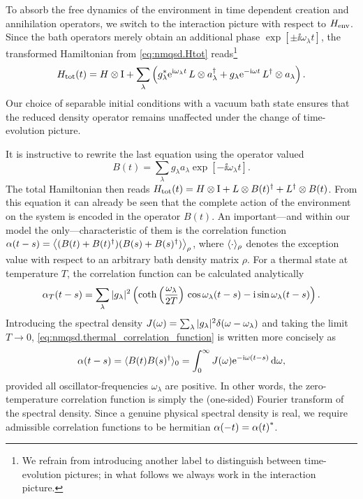 To absorb the free dynamics of the environment in time dependent creation and annihilation operators, we switch to the interaction picture with respect to $H_\mathrm{env}$.
Since the bath operators merely obtain an additional phase $\exp[\pm \ii \omega_\lambda t]$, the transformed Hamiltonian from \autoref{eq:nmqsd.Htot} reads\footnote{%
  We refrain from introducing another label to distinguish between time-evolution pictures; in what follows we always work in the interaction picture.
}
\begin{equation}
  \Htot(t) = \Hsys \otimes \unit  +  \sum_\lambda \left( \cc{g}_\lambda \exp[\ii \omega_\lambda t] \, L \otimes \adj{a}_\lambda + g_\lambda \exp[-\ii \omega t] \, \adj{L} \otimes a_\lambda \right).
  \label{eq:nmqsd.Htot}
\end{equation}
Our choice of separable initial conditions with a vacuum bath state ensures that the reduced density operator remains unaffected under the change of time-evolution picture.

It is instructive to rewrite the last equation using the operator valued 
\begin{equation}
  B(t)=\sum_\lambda g_\lambda a_\lambda \exp[-\ii\omega_\lambda t].
  \label{eq:nmqsd.force_operator}
\end{equation}
The total Hamiltonian then reads $H_\mathrm{tot}(t) = H \otimes \mathrm{I}  +  L \otimes B(t)^\dagger  +  L^\dagger \otimes B(t)$.
From this equation it can already be seen that the complete action of the environment on the system is encoded in the operator $B(t)$.
An important---and within our model the only---characteristic of them is the correlation function $\alpha(t-s) = \big\langle  (B(t) + B(t)^\dagger)(B(s) + B(s)^\dagger) \big\rangle_\rho$, where $\langle \cdot \rangle_\rho$ denotes the exception value with respect to an arbitrary bath density matrix $\rho$.
For a thermal state at temperature $T$, the correlation function can be calculated analytically \cite{FeHi10_path_integrals}
\begin{equation}
  \alpha_T(t - s) = \sum_\lambda  \vert g_\lambda \vert^2  \left( \operatorname{coth} \left( \frac{\omega_\lambda}{2T} \right) \, \cos \omega_\lambda (t-s)  -  \mathrm{i} \sin \omega_\lambda(t-s) \right).
  \label{eq:nmqsd.thermal_correlation_function}
\end{equation}
Introducing the spectral density $J(\omega) = \sum_\lambda \vert g_\lambda \vert^2 \delta(\omega - \omega_\lambda)$ and taking the limit $T \to 0$, \autoref{eq:nmqsd.thermal_correlation_function} is written more concisely as
\begin{equation}
  \alpha(t - s) = \qmean{B(t)\adj{B(s)}}_0 = \int_0^\infty J(\omega) \exp[-\ii\omega (t-s)] \dd \omega,
  \label{eq:nmqsd.correlation_function}
\end{equation}
provided all oscillator-frequencies $\omega_\lambda$ are positive.
In other words, the zero-temperature correlation function is simply the (one-sided) Fourier transform of the spectral density.
Since a genuine physical spectral density is real, we require admissible correlation functions to be hermitian $\alpha(-t) = {\alpha(t)}^*$.

